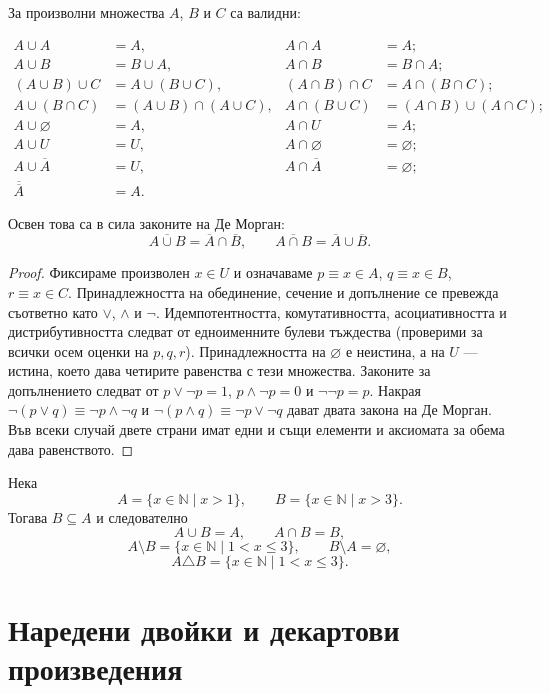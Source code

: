 \begin{prop}
За произволни множества $A$, $B$ и $C$ са валидни:

\begin{align*}
A\cup A&=A, & A\cap A&=A;\\
A\cup B&=B\cup A, & A\cap B&=B\cap A;\\
(A\cup B)\cup C&=A\cup(B\cup C), &
(A\cap B)\cap C&=A\cap(B\cap C);\\
A\cup(B\cap C)&=(A\cup B)\cap(A\cup C),&
A\cap(B\cup C)&=(A\cap B)\cup(A\cap C);\\
A\cup\varnothing&=A, & A\cap U&=A;\\
A\cup U&=U, & A\cap\varnothing&=\varnothing;\\
A\cup\overline A&=U, & A\cap\overline A&=\varnothing;\\
\overline{\overline A}&=A. &&
\end{align*}

Освен това са в сила законите на Де Морган:
\[
\overline{A\cup B}=\overline A\cap\overline B,
\qquad
\overline{A\cap B}=\overline A\cup\overline B.
\]
\end{prop}

\begin{proof}
Фиксираме произволен $x\in U$ и означаваме $p\equiv x\in A$, $q\equiv x\in B$, $r\equiv x\in C$. Принадлежността на обединение, сечение и допълнение се превежда съответно като $\lor$, $\land$ и $\neg$. Идемпотентността, комутативността, асоциативността и дистрибутивността следват от едноименните булеви тъждества (проверими за всички осем оценки на $p,q,r$). Принадлежността на $\varnothing$ е неистина, а на $U$ --- истина, което дава четирите равенства с тези множества. Законите за допълнението следват от $p\lor\neg p=1$, $p\land\neg p=0$ и $\neg\neg p=p$. Накрая $\neg(p\lor q)\equiv\neg p\land\neg q$ и $\neg(p\land q)\equiv\neg p\lor\neg q$ дават двата закона на Де Морган. Във всеки случай двете страни имат едни и същи елементи и аксиомата за обема дава равенството.
\end{proof}

\begin{example}
Нека
\[
A=\{x\in\mathbb N\mid x>1\},
\qquad
B=\{x\in\mathbb N\mid x>3\}.
\]
Тогава $B\subseteq A$ и следователно
\[
A\cup B=A,\qquad A\cap B=B,
\]
\[
A\setminus B=\{x\in\mathbb N\mid 1<x\leq 3\},
\qquad
B\setminus A=\varnothing,
\]
\[
A\triangle B=\{x\in\mathbb N\mid 1<x\leq 3\}.
\]
\end{example}

\section{Наредени двойки и декартови произведения}\label{s:1.4}

